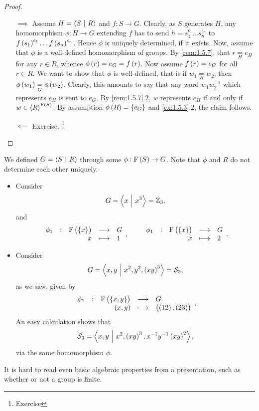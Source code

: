 \begin{proof}
\hfill
\begin{itemize}
\item[$ \implies $] Assume $ H = \left\langle S \ \middle| \  R \right\rangle $ and $ f : S \to G $. Clearly, as $ S $ generates $ H $, any homomorphism $ \phi : H \to G $ extending $ f $ has to send $ h = s_1^{\epsilon_1} \dots s_n^{\epsilon_n} $ to $ f\br{s_1}^{\epsilon_1} \dots f\br{s_n}^{\epsilon_n} $. Hence $ \phi $ is uniquely determined, if it exists. Now, assume that $ \phi $ is a well-defined homomorphism of groups. By \ref{rem:1.5.7}, that $ r \underset{H}{=} e_H $ for any $ r \in R $, whence $ \phi\br{r} = e_G = f\br{r} $. Now assume $ f\br{r} = e_G $ for all $ r \in R $. We want to show that $ \phi $ is well-defined, that is if $ w_1 \underset{H}{=} w_2 $, then $ \phi\br{w_1} \underset{G}{=} \phi\br{w_2} $. Clearly, this amounts to say that any word $ w_1w_2^{-1} $ which represents $ e_H $ is sent to $ e_G $. By \ref{rem:1.5.7}.$ 2 $, $ w $ represents $ e_H $ if and only if $ w \in \abr{R}^{\F\br{S}} $. By assumption $ \phi\br{R} = \cbr{e_G} $ and \ref{ex:1.5.3}.$ 2 $, the claim follows.
\item[$ \impliedby $] Exercise. \footnote{Exercise}
\end{itemize}
\end{proof}


\begin{remark}
We defined $ G = \left\langle S \ \middle| \  R \right\rangle $ through some $ \phi : \F\br{S} \to G $. Note that $ \phi $ and $ R $ do not determine each other uniquely.
\end{remark}

\begin{example*}
\hfill
\begin{itemize}
\item Consider
$$ G = \left\langle x \ \middle| \  x^3 \right\rangle = \mathbb{Z}_3, $$
and
$$ \function[\phi_1]{\F\br{\cbr{x}}}{G}{x}{1}, \qquad \function[\phi_1]{\F\br{\cbr{x}}}{G}{x}{2}. $$
\item Consider
$$ G = \abr{x, y \st x^2, y^2, \br{xy}^3} = \SSS_3, $$
as we saw, given by
$$ \function[\phi_1]{\F\br{\cbr{x, y}}}{G}{\br{x, y}}{\br{\br{12}, \br{23}}}. $$
An easy calculation shows that
$$ \SSS_3 = \abr{x, y \st x^2, \br{xy}^3, x^{-1}y^{-1}\br{xy}^2}, $$
via the same homomorphism $ \phi $.
\end{itemize}
\end{example*}

It is hard to read even basic algebraic properties from a presentation, such as whether or not a group is finite.

